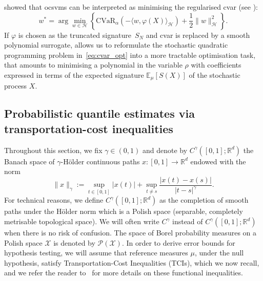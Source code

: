 \documentclass[twoside,11pt]{article}
\numberwithin{equation}{section}
\numberwithin{theorem}{section}
\newcommand{\R}{\mathbb{R}}
\newcommand{\X}{\mathcal{X}}
\newcommand{\ex}{\mathbb{E}}
\newcommand{\h}{\mathcal{H}}
\begin{document}
\cite{tsyurmasto2014value} showed that \glspl{ocsvm} can be interpreted as minimising the regularised \acrshort{cvar} (see ):
\begin{equation}\label{eq:cvar_opt}
w^*=\arg\min_{w\in \h}\left\{ \mathrm{CVaR}_{\alpha}(-\langle w, \varphi(X)\rangle_{\h})+\frac{1}{2} \|w\|^2_{\h}\right\}.
\end{equation}
If $\varphi$ is chosen as the truncated signature~$S_N$ and \acrshort{cvar} is replaced by a smooth polynomial surrogate,  allows us to reformulate the stochastic quadratic programming problem in~\eqref{eq:cvar_opt} into a more tractable optimisation task, that amounts to minimising a polynomial
in the variable $\rho$ with coefficients expressed in terms of the expected signature $\ex_\mu[S(X)]$ of the stochastic process $X$.


\subsection{Probabilistic quantile estimates via  transportation-cost inequalities}\label{ssec:probabilistic_estimates}
Throughout this section, we fix $\gamma\in(0, 1)$ and denote by $C^\gamma([0,1];\R^d)$ the Banach space of $\gamma$-H\"older continuous paths $x:[0,1]\rightarrow\R^d$ endowed with the norm  $$
\|x\|_\gamma:=\sup_{t\in[0,1]}|x(t)|+\sup_{t\neq s}\frac{|x(t)-x(s)|}{|t-s|^{\gamma}}.
$$ For technical reasons, we define $C^\gamma([0,1];\R^d)$ as the completion of smooth paths under the H\"older norm which is a Polish space (separable, completely metrisable topological space). We will often write $C^\gamma$ instead of $C^\gamma([0,1];\R^d)$ when there is no risk of confusion.  The space of Borel probability measures on a Polish space $\X$ is denoted by $\mathscr{P}(\X).$
In order to derive error bounds for hypothesis testing, we will assume that reference measures $\mu$, under the null hypothesis, satisfy Transportation-Cost Inequalities (TCIs),
which we now recall, 
and we refer the reader to~\citep{gasteratos2023transportation} for more details on these functional inequalities.
\end{document}
